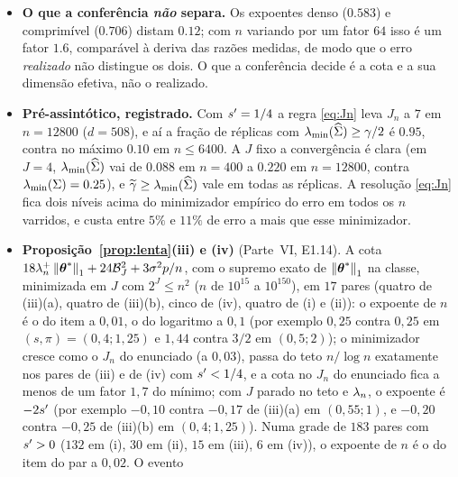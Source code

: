 \documentclass[11pt,a4paper]{article}
\newcommand{\lmin}{\lambda_{\min}}
\newcommand{\gtil}{\widetilde{\gamma}}
\newcommand{\Mstar}{M^{\star}}
\begin{document}
\begin{itemize}[nosep, leftmargin=*]
    $\Mstar_{n}$ da cota é sempre interior e a cota nele é de $51$ a $103$
    vezes menor que a leitura densa $M = d$. A inclinação log-log de
    $\Mstar_{n}$ em $n$ é $0.39$, contra o alvo $\tau/2 = 0.29$; a de
    $h(\Mstar)$ em $\pen$ é $1.65$, contra o alvo $2-\tau = 1.41$.
  \item \textbf{O que a conferência \emph{não} separa.} Os expoentes denso
    ($0.583$) e comprimível ($0.706$) distam $0.12$; com $n$ variando por um
    fator $64$ isso é um fator $1.6$, comparável à deriva das razões
    medidas, de modo que o erro \emph{realizado} não distingue os dois. O que
    a conferência decide é a cota e a sua dimensão efetiva, não o realizado.
  \item \textbf{Pré-assintótico, registrado.} Com $s' = 1/4$ a regra
    \eqref{eq:Jn} leva $J_{n}$ a $7$ em $n = 12800$ ($d = 508$), e aí a
    fração de réplicas com $\lmin(\Gramhat) \ge \gamma/2$ é $0.95$, contra no
    máximo $0.10$ em $n \le 6400$. A $J$ fixo a convergência é clara
    (em $J = 4$, $\lmin(\Gramhat)$ vai de $0.088$ em $n = 400$ a $0.220$ em
    $n = 12800$, contra $\lmin(\Gram) = 0.25$), e $\gtil \ge \lmin(\Gramhat)$ vale em todas as
    réplicas. A resolução \eqref{eq:Jn} fica dois níveis acima do
    minimizador empírico do erro em todos os $n$ varridos, e custa entre $5\%$
    e $11\%$ de erro a mais que esse minimizador.
  \item \textbf{Proposição~\ref{prop:lenta}(iii) e (iv)} (Parte~VI, E1.14).
    A cota $18\lambda_{n}^{+}\left\lVert \boldsymbol{\theta}^{*} \right\rVert_{1} + 24\mathcal{B}_{J}^{2} +
    3\sigma^{2}p/n$, com o supremo exato de $\left\lVert \boldsymbol{\theta}^{*} \right\rVert_{1}$ na classe,
    minimizada em $J$ com $2^{J} \le n^{2}$ ($n$ de $10^{15}$ a $10^{150}$), em
    $17$ pares (quatro de (iii)(a), quatro de (iii)(b), cinco de (iv), quatro
    de (i) e (ii)): o expoente de $n$ é o do item a $0{,}01$, o do logaritmo a
    $0{,}1$ (por exemplo $0{,}25$ contra $0{,}25$ em $(s,\pi) = (0{,}4;1{,}25)$
    e $1{,}44$ contra $3/2$ em $(0{,}5;2)$); o minimizador cresce como o $J_{n}$
    do enunciado (a $0{,}03$), passa do teto $n/\log n$ exatamente nos pares
    de (iii) e de (iv) com $s' < 1/4$, e a cota no $J_{n}$ do enunciado
    fica a menos de um fator $1{,}7$ do mínimo; com $J$ parado no teto e
    $\lambda_{n}$, o expoente é $-2s'$ (por exemplo $-0{,}10$ contra
    $-0{,}17$ de (iii)(a) em $(0{,}55;1)$, e $-0{,}20$ contra $-0{,}25$ de
    (iii)(b) em $(0{,}4;1{,}25)$). Numa grade de $183$ pares com
    $s' > 0$ ($132$ em (i), $30$ em (ii), $15$ em (iii), $6$ em (iv)), o
    expoente de $n$ é o do item do par a $0{,}02$. O evento

\end{itemize}
\end{document}
